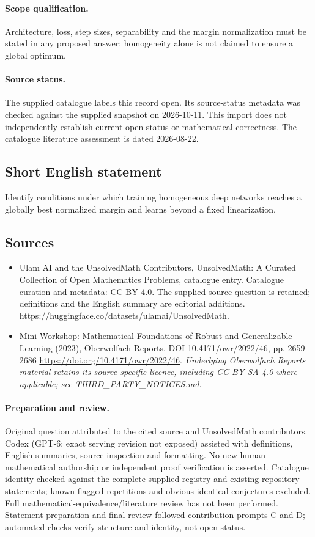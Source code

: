 \documentclass[11pt]{article}
\begin{document}
\paragraph{Scope qualification.}
Architecture, loss, step sizes, separability and the margin normalization must be stated in any proposed answer; homogeneity alone is not claimed to ensure a global optimum.
\paragraph{Source status.}
The supplied catalogue labels this record open. Its source-status metadata was checked against the supplied snapshot on 2026-10-11. This import does not independently establish current open status or mathematical correctness. The catalogue literature assessment is dated 2026-08-22.
\subsection{Short English statement}
Identify conditions under which training homogeneous deep networks reaches a globally best normalized margin and learns beyond a fixed linearization.
\subsection{Sources}
\begin{itemize}
\item[S1] Ulam AI and the UnsolvedMath Contributors, UnsolvedMath: A Curated Collection of Open Mathematics Problems, catalogue entry. Catalogue curation and metadata: CC BY 4.0. The supplied source question is retained; definitions and the English summary are editorial additions.
\url{https://huggingface.co/datasets/ulamai/UnsolvedMath}.
\item[S2] Mini-Workshop: Mathematical Foundations of Robust and Generalizable Learning (2023), Oberwolfach Reports, DOI 10.4171/owr/2022/46, pp. 2659--2686
\url{https://doi.org/10.4171/owr/2022/46}.
\textit{Underlying Oberwolfach Reports material retains its source-specific licence, including CC BY-SA 4.0 where applicable; see THIRD\_PARTY\_NOTICES.md.}
\end{itemize}
\paragraph{Preparation and review.}
Original question attributed to the cited source and UnsolvedMath contributors. Codex (GPT-6; exact serving revision not exposed) assisted with definitions, English summaries, source inspection and formatting. No new human mathematical authorship or independent proof verification is asserted. Catalogue identity checked against the complete supplied registry and existing repository statements; known flagged repetitions and obvious identical conjectures excluded. Full mathematical-equivalence/literature review has not been performed. Statement preparation and final review followed contribution prompts C and D; automated checks verify structure and identity, not open status.
\label{end:statement}
\end{document}
